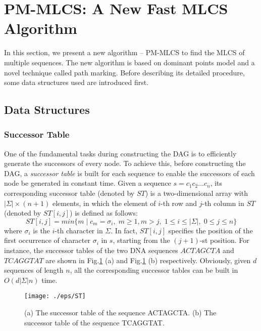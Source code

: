 \documentclass{article}
\begin{document}
\section{PM-MLCS: A New Fast MLCS Algorithm}
\label{sec:PM-MLCS}

In this section, we present a new algorithm -- PM-MLCS to find the
MLCS of multiple sequences. The new algorithm is based on dominant
points model and a novel technique called path marking. Before
describing its detailed procedure, some data structures used are
introduced first.

\subsection{Data Structures}
\label{sec:data structures}

\subsubsection{Successor Table}
\label{sec:successor table}

One of the fundamental tasks during constructing the DAG is to
efficiently generate the successors of every node. To achieve this,
before constructing the DAG, a \emph{successor table} \cite{Chen2006}
is built for each sequence to enable the successors of each node be
generated in constant time. Given a sequence $s=c_1c_2...c_n$, its
corresponding successor table (denoted by $ST$) is a two-dimensional
array with $|\Sigma| \times (n+1)$ elements, in which the element of
$i$-th row and $j$-th column in $ST$ (denoted by $ST[i, j]$) is
defined as follows:
$$ST[i,j]=min\{m\;|\;c_m=\sigma_i,\; m \geq 1, m > j,\; 1 \leq i \leq
|\Sigma|,\; 0 \leq j \leq n\}$$ where $\sigma_i$ is the $i$-th
character in $\Sigma$. In fact, $ST[i,j]$ specifies the position of
the first occurrence of character $\sigma_i$ in $s$, starting from the
$(j+1)$-st position. For instance, the successor tables of the two DNA
sequences $ACTAGCTA$ and $TCAGGTAT$ are shown in Fig.\ref{fig:ST} (a)
and Fig.\ref{fig:ST} (b) respectively. Obviously, given $d$ sequences
of length $n$, all the corresponding successor tables can be built in
$O(d|\Sigma|n)$ time.


\begin{figure}[htbp]
  \centering
  \texttt{[image: ./eps/ST]}
  \caption{(a) The successor table of the sequence ACTAGCTA. (b) The
    successor table of the sequence TCAGGTAT.}
  \label{fig:ST}
\end{figure}
\end{document}
